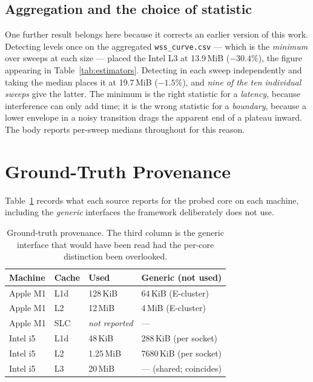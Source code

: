 \documentclass[conference]{IEEEtran}
\begin{document}
\subsection{Aggregation and the choice of statistic}

One further result belongs here because it corrects an earlier version of this
work. Detecting levels once on the aggregated \texttt{wss\_curve.csv} --- which is
the \emph{minimum} over sweeps at each size --- placed the Intel L3 at 13.9\,MiB
($-30.4\%$), the figure appearing in Table~\ref{tab:estimators}. Detecting in each
sweep independently and taking the median places it at 19.7\,MiB ($-1.5\%$), and
\emph{nine of the ten individual sweeps} give the latter. The minimum is the right
statistic for a \emph{latency}, because interference can only add time; it is the
wrong statistic for a \emph{boundary}, because a lower envelope in a noisy
transition drags the apparent end of a plateau inward. The body reports per-sweep
medians throughout for this reason.

\section{Ground-Truth Provenance}
\label{app:provenance}

Table~\ref{tab:provenance} records what each source reports for the probed core on
each machine, including the \emph{generic} interfaces the framework deliberately
does not use.

\begin{table}[h]
\caption{Ground-truth provenance. The third column is the generic interface that
would have been read had the per-core distinction been overlooked.}
\label{tab:provenance}
\centering
\footnotesize
\begin{tabular}{@{}llll@{}}
\toprule
\textbf{Machine} & \textbf{Cache} & \textbf{Used} & \textbf{Generic (not used)} \\
\midrule
Apple M1 & L1d & 128\,KiB   & 64\,KiB (E-cluster) \\
Apple M1 & L2  & 12\,MiB    & 4\,MiB (E-cluster) \\
Apple M1 & SLC & \emph{not reported} & --- \\
Intel i5 & L1d & 48\,KiB    & 288\,KiB (per socket) \\
Intel i5 & L2  & 1.25\,MiB  & 7680\,KiB (per socket) \\
Intel i5 & L3  & 20\,MiB    & --- (shared; coincides) \\
\bottomrule
\end{tabular}
\end{table}
\end{document}
